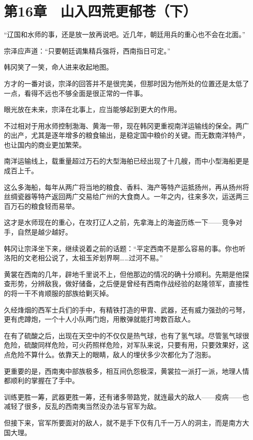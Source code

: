\section{第16章　山入四荒更郁苍（下）}

“辽国和水师的事，还是放一放再说吧。近几年，朝廷用兵的重心也不会在北面。”

宗泽应声道：“只要朝廷调集精兵强将，西南指日可定。”

韩冈笑了一笑，命人进来收起地图。

方才的一番对谈，宗泽的回答并不是很完美，但那时因为他所处的位置还是太低了一点，看得不远也不够全面是很正常的一件事。

眼光放在未来，宗泽在北事上，应当能够起到更大的作用。

不过相对于用水师控制渤海、黄海一带，现在韩冈更重视南洋运输线的保全。两广的出产，尤其是逐年增多的粮食输出，是稳定国中粮价的关键。而无数南洋特产，也让国内的商业更加繁荣。

南洋运输线上，载重量超过万石的大型海舶已经出现了十几艘，而中小型海船更是成百上千。

这么多海船，每年从两广将当地的粮食、香料、海产等特产运抵扬州，再从扬州将丝绸瓷器等特产返回两广交易给广州的大食商人。一年之内，往来多次，运送两三百万石的粮食轻而易举。

这才是水师现在的重心，在攻打辽人之前，先拿海上的海盗历练一下——竞争对手，自然是越少越好。

韩冈让宗泽坐下来，继续说着之前的话题：“平定西南不是那么容易的事。你也听洛阳的文老相公说了，太祖玉斧划界啊……过河不易。”

黄裳在西南的几年，辟地千里说不上，但他那边的情况的确十分顺利。先期是他探查形势，分辨敌我，做好储备，之后便是曾经有西南作战经验的赵隆领军，直接性的将一干不肯顺服的部族给剿灭掉。

久经烽烟的西军士兵们的手中，有精铁打造的甲胄、武器，还有威力强劲的弓弩，更有虎蹲炮，一个十人小队两门炮，用散弹就能打垮数百敌人。

在有了硫酸之后，出现在天空中的不仅仅是热气球，也有了氢气球。尽管氢气球很危险，硫酸同样危险，可火药照样危险，对军队来说，只要有用，只要效果好，这点危险不算什么。依靠天上的眼睛，敌人的埋伏多少次都化为了泡影。

更重要的是，西南夷中部族极多，相互间仇怨极深，黄裳拉一派打一派，地理人情都顺利的掌握在了手中。

训练更胜一筹，武器更胜一筹，还有诸多带路党，就连最大的敌人——疫病——也减轻了很多，反乱的西南夷当然没办法与官军为敌。

但接下来，官军所要面对的敌人，就不是手下仅有几千一万人的洞主，而是南方大国大理。

